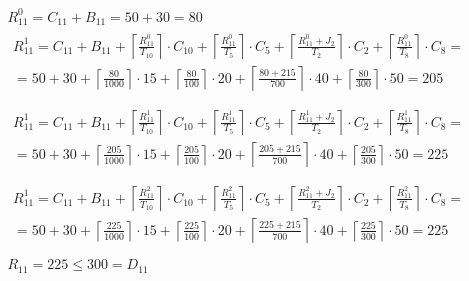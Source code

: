\begin{gather*}
  R_{11}^0 = C_{11} + B_{11} = 50 + 30 = 80 \\
  \begin{multlined}
    R_{11}^1 = C_{11} + B_{11} + %
    \left\lceil\frac{R_{11}^0}{T_{10}}\right\rceil\cdot C_{10} + %
    \left\lceil\frac{R_{11}^0}{T_5}\right\rceil\cdot C_5 + %
    \left\lceil\frac{R_{11}^0 + J_2}{T_2}\right\rceil\cdot C_2 + %
    \left\lceil\frac{R_{11}^0}{T_8}\right\rceil\cdot C_8 = \\%
    = 50 + 30 + \left\lceil\frac{80}{1000}\right\rceil\cdot 15 + %
    \left\lceil\frac{80}{100}\right\rceil\cdot 20 + %
    \left\lceil\frac{80 + 215}{700}\right\rceil\cdot 40 + %
    \left\lceil\frac{80}{300}\right\rceil\cdot 50 = 205 \\
  \end{multlined} \\
  \begin{multlined}
    R_{11}^1 = C_{11} + B_{11} + %
    \left\lceil\frac{R_{11}^1}{T_{10}}\right\rceil\cdot C_{10} + %
    \left\lceil\frac{R_{11}^1}{T_5}\right\rceil\cdot C_5 + %
    \left\lceil\frac{R_{11}^1 + J_2}{T_2}\right\rceil\cdot C_2 + %
    \left\lceil\frac{R_{11}^1}{T_8}\right\rceil\cdot C_8 = \\%
    = 50 + 30 + \left\lceil\frac{205}{1000}\right\rceil\cdot 15 + %
    \left\lceil\frac{205}{100}\right\rceil\cdot 20 + %
    \left\lceil\frac{205 + 215}{700}\right\rceil\cdot 40 + %
    \left\lceil\frac{205}{300}\right\rceil\cdot 50 = 225 \\
  \end{multlined} \\
  \begin{multlined}
    R_{11}^1 = C_{11} + B_{11} + %
    \left\lceil\frac{R_{11}^2}{T_{10}}\right\rceil\cdot C_{10} + %
    \left\lceil\frac{R_{11}^2}{T_5}\right\rceil\cdot C_5 + %
    \left\lceil\frac{R_{11}^2 + J_2}{T_2}\right\rceil\cdot C_2 + %
    \left\lceil\frac{R_{11}^2}{T_8}\right\rceil\cdot C_8 = \\%
    = 50 + 30 + \left\lceil\frac{225}{1000}\right\rceil\cdot 15 + %
    \left\lceil\frac{225}{100}\right\rceil\cdot 20 + %
    \left\lceil\frac{225 + 215}{700}\right\rceil\cdot 40 + %
    \left\lceil\frac{225}{300}\right\rceil\cdot 50 = 225 \\
  \end{multlined} \\
  R_{11} = 225 \le 300 = D_{11}
\end{gather*}

